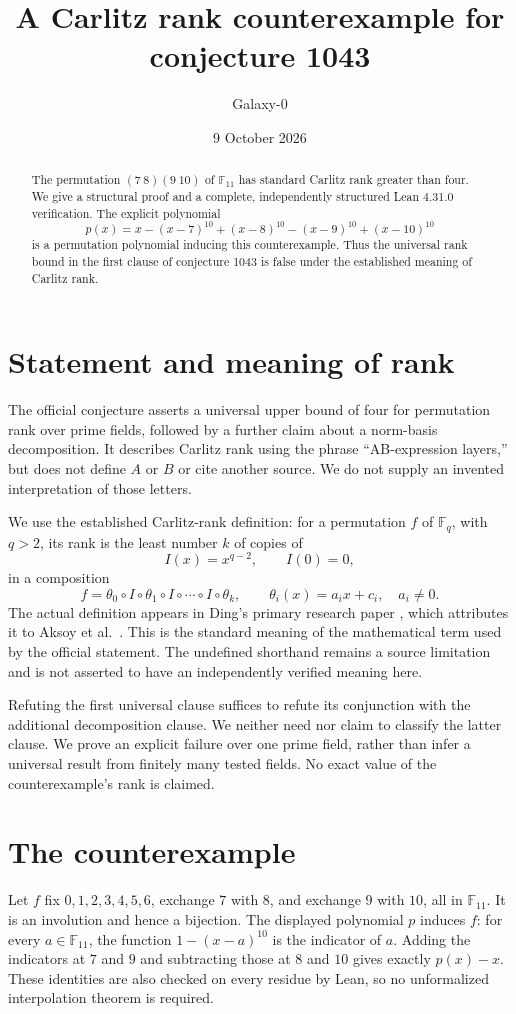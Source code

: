 \documentclass[11pt]{article}
\title{A Carlitz rank counterexample for conjecture 1043}
\author{Galaxy-0}
\date{9 October 2026}
\newcommand{\F}{\mathbb F}
\begin{document}
\maketitle
\begin{abstract}
The permutation $(7\ 8)(9\ 10)$ of $\F_{11}$ has standard Carlitz rank greater than four. We give a structural proof and a complete, independently structured Lean 4.31.0 verification. The explicit polynomial
\[
p(x)=x-(x-7)^{10}+(x-8)^{10}-(x-9)^{10}+(x-10)^{10}
\]
is a permutation polynomial inducing this counterexample. Thus the universal rank bound in the first clause of conjecture 1043 is false under the established meaning of Carlitz rank.
\end{abstract}

\section{Statement and meaning of rank}
The official conjecture asserts a universal upper bound of four for permutation rank over prime fields, followed by a further claim about a norm-basis decomposition. It describes Carlitz rank using the phrase ``AB-expression layers,'' but does not define $A$ or $B$ or cite another source. We do not supply an invented interpretation of those letters.

We use the established Carlitz-rank definition: for a permutation $f$ of $\F_q$, with $q>2$, its rank is the least number $k$ of copies of
\[
 I(x)=x^{q-2},\qquad I(0)=0,
\]
in a composition
\[
 f=\theta_0\circ I\circ\theta_1\circ I\circ\cdots\circ I\circ\theta_k,
 \qquad \theta_i(x)=a_i x+c_i,\quad a_i\ne0.
\]
The actual definition appears in Ding's primary research paper \cite[Section 4, after Theorem 10]{ding}, which attributes it to Aksoy et al.\ \cite{aksoy}. This is the standard meaning of the mathematical term used by the official statement. The undefined shorthand remains a source limitation and is not asserted to have an independently verified meaning here.

Refuting the first universal clause suffices to refute its conjunction with the additional decomposition clause. We neither need nor claim to classify the latter clause. We prove an explicit failure over one prime field, rather than infer a universal result from finitely many tested fields. No exact value of the counterexample's rank is claimed.

\section{The counterexample}
Let $f$ fix $0,1,2,3,4,5,6$, exchange $7$ with $8$, and exchange $9$ with $10$, all in $\F_{11}$. It is an involution and hence a bijection. The displayed polynomial $p$ induces $f$: for every $a\in\F_{11}$, the function $1-(x-a)^{10}$ is the indicator of $a$. Adding the indicators at $7$ and $9$ and subtracting those at $8$ and $10$ gives exactly $p(x)-x$. These identities are also checked on every residue by Lean, so no unformalized interpolation theorem is required.
\end{document}
